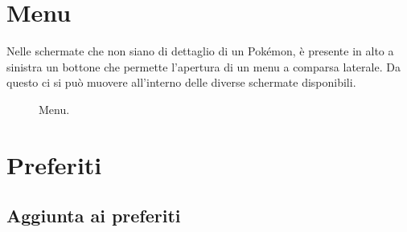 \documentclass[a4paper,11pt]{article}
\begin{document}
\section{Menu}
Nelle schermate che non siano di dettaglio di un Pokémon, è presente in alto a sinistra un bottone che permette l’apertura di un menu a comparsa laterale. Da questo ci si può muovere all’interno delle diverse schermate disponibili.
  \begin{figure}[h!]
    \centering
  \caption{Menu.}
\end{figure}
\newpage

\section{Preferiti}
    \subsection{Aggiunta ai preferiti}
\end{document}
